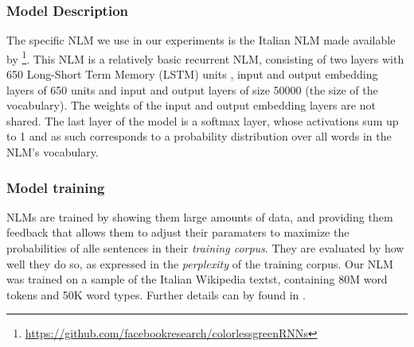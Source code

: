 \subsubsection{Model Description}
The specific NLM we use in our experiments is the Italian NLM made available by \citet{Gulordava:etal:2018}\footnote{\url{https://github.com/facebookresearch/colorlessgreenRNNs}}.
This NLM is a relatively basic recurrent NLM, consisting of two layers with 650 Long-Short Term Memory (LSTM) units \citep{Hochreiter:Schmidhuber:1997}, input and output embedding layers of 650 units and input and output layers of size 50000 (the size of the vocabulary). 
The weights of the input and output embedding layers are not shared.
The last layer of the model is a softmax layer, whose activations sum up to 1 and as such corresponds to a probability distribution over all words in the NLM's vocabulary. 

\subsubsection{Model training}
NLMs are trained by showing them large amounts of data, and providing them feedback that allows them to adjust their paramaters to maximize the probabilities of alle sentences in their \emph{training corpus}.
They are evaluated by how well they do so, as expressed in the \emph{perplexity} of the training corpus.
Our NLM was trained on a sample of the Italian Wikipedia textst, containing 80M word tokens and 50K word types. 
Further details can by found in \citet{Gulordava:etal:2018}.

% 
